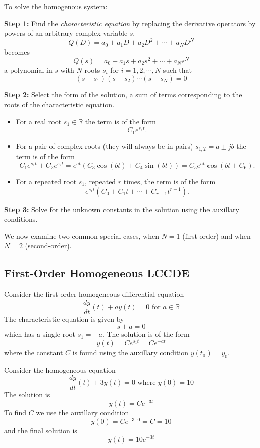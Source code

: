 To solve the homogenous system:

\textbf{Step 1:} Find the \emph{characteristic equation} by replacing the derivative operators by powers of an arbitrary complex variable $s$.
\[
Q(D) = a_0 + a_1D + a_2D^2 + \cdots + a_ND^N
\]
becomes
\[
Q(s) = a_0 + a_1s + a_2s^2 + \cdots + a_Ns^N
\]
a polynomial in $s$ with $N$ roots $s_i$ for $i = 1, 2, \cdots, N$ such that
\[
(s - s_1)(s-s_2)\cdots(s-s_N) = 0
\]

\textbf{Step 2:} Select the form of the solution, a sum of terms corresponding to the roots of the characteristic equation.

\begin{itemize}
\item For a real root $s_1\in \mathbb{R}$ the term is of the form
  \[
  C_1 e^{s_1 t}.
  \]
\item For a pair of complex roots (they will always be in pairs) $s_{1,2} = a \pm jb$ the term is of the form
  \[
  C_1 e^{s_1 t} + C_2 e^{s_2 t} = e^{a t}\left(C_3\cos(bt) + C_4\sin(bt)\right) = C_5 e^{a t}\cos(bt + C_6).
  \]
\item For a repeated root $s_1$, repeated $r$ times, the term is of the form
  \[
  e^{s_1 t} (C_0 + C_1 t + \cdots + C_{r-1} t^{r-1}).\]
\end{itemize}

\textbf{Step 3:} Solve for the unknown constants in the solution using the auxillary conditions. 

We now examine two common special cases, when $N=1$ (first-order) and when $N=2$ (second-order).

\subsection{First-Order Homogeneous LCCDE}

Consider the first order homogeneous differential equation
\[
\frac{dy}{dt}(t) + ay(t) = 0 \mbox{ for } a \in \mathbb{R}
\]
The characteristic equation is given by
\[
s + a = 0
\]
which has a single root $s_1 = -a$. The solution is of the form
\[
y(t) = Ce^{s_1 t} = Ce^{-a t} 
\]
where the constant $C$ is found using the auxillary condition $y(t_0) = y_0$.

\begin{example}
Consider the homogeneous equation
\[
\frac{dy}{dt}(t) + 3y(t) = 0 \mbox{ where } y(0) = 10
\]
The solution is
\[
y(t) = Ce^{-3 t} 
\]
To find $C$ we use the auxillary condition
\[
y(0) = Ce^{-3 \cdot 0} = C = 10
\]
and the final solution is
\[
y(t) = 10e^{-3 t} 
\]
\end{example}


